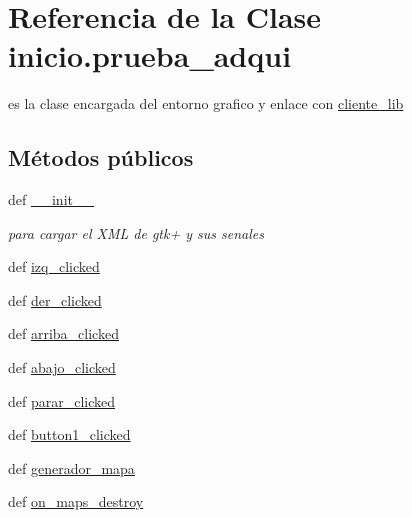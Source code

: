 \hypertarget{classinicio_1_1prueba__adqui}{
\section{Referencia de la Clase inicio.prueba\_\-adqui}
\label{classinicio_1_1prueba__adqui}
}


es la clase encargada del entorno grafico y enlace con \hyperlink{namespacecliente__lib}{cliente\_\-lib}  


\subsection*{Métodos públicos}
\begin{DoxyCompactItemize}
\item 
def \hyperlink{classinicio_1_1prueba__adqui_adab3c8bf1d5be6b8523065ccd474765a}{\_\-\_\-init\_\-\_\-}
\begin{DoxyCompactList}\small\item\em para cargar el XML de gtk+ y sus senales \end{DoxyCompactList}\item 
def \hyperlink{classinicio_1_1prueba__adqui_af626267088da2ac8ad96d85b91850c05}{izq\_\-clicked}
\item 
def \hyperlink{classinicio_1_1prueba__adqui_ad5348d604e42fe8466b4c1f7338068bf}{der\_\-clicked}
\item 
def \hyperlink{classinicio_1_1prueba__adqui_add1484bca105dc4a14533c487e6f7a78}{arriba\_\-clicked}
\item 
def \hyperlink{classinicio_1_1prueba__adqui_abac92d1dcf8c253686ddbf0ef741f692}{abajo\_\-clicked}
\item 
def \hyperlink{classinicio_1_1prueba__adqui_a133dddf01f8261f6cca38064b8ae006f}{parar\_\-clicked}
\item 
def \hyperlink{classinicio_1_1prueba__adqui_a903f8caf83ea99a6a35a31089cee5944}{button1\_\-clicked}
\item 
def \hyperlink{classinicio_1_1prueba__adqui_a24ae8befd66a50575811e300464e7f1a}{generador\_\-mapa}
\item 
def \hyperlink{classinicio_1_1prueba__adqui_a448fd223767febb13d3f929fcddc85cf}{on\_\-maps\_\-destroy}
\end{DoxyCompactItemize}
